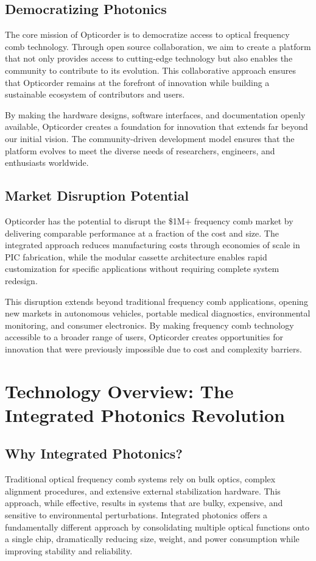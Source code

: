 \documentclass[11pt,a4paper]{article}
\begin{document}
\subsection{Democratizing Photonics}
The core mission of Opticorder is to democratize access to optical frequency comb technology. Through open source collaboration, we aim to create a platform that not only provides access to cutting-edge technology but also enables the community to contribute to its evolution. This collaborative approach ensures that Opticorder remains at the forefront of innovation while building a sustainable ecosystem of contributors and users.

By making the hardware designs, software interfaces, and documentation openly available, Opticorder creates a foundation for innovation that extends far beyond our initial vision. The community-driven development model ensures that the platform evolves to meet the diverse needs of researchers, engineers, and enthusiasts worldwide.

\subsection{Market Disruption Potential}
Opticorder has the potential to disrupt the \$1M+ frequency comb market by delivering comparable performance at a fraction of the cost and size. The integrated approach reduces manufacturing costs through economies of scale in PIC fabrication, while the modular cassette architecture enables rapid customization for specific applications without requiring complete system redesign.

This disruption extends beyond traditional frequency comb applications, opening new markets in autonomous vehicles, portable medical diagnostics, environmental monitoring, and consumer electronics. By making frequency comb technology accessible to a broader range of users, Opticorder creates opportunities for innovation that were previously impossible due to cost and complexity barriers.

\section{Technology Overview: The Integrated Photonics Revolution}

\subsection{Why Integrated Photonics?}
Traditional optical frequency comb systems rely on bulk optics, complex alignment procedures, and extensive external stabilization hardware. This approach, while effective, results in systems that are bulky, expensive, and sensitive to environmental perturbations. Integrated photonics offers a fundamentally different approach by consolidating multiple optical functions onto a single chip, dramatically reducing size, weight, and power consumption while improving stability and reliability.
\end{document}
